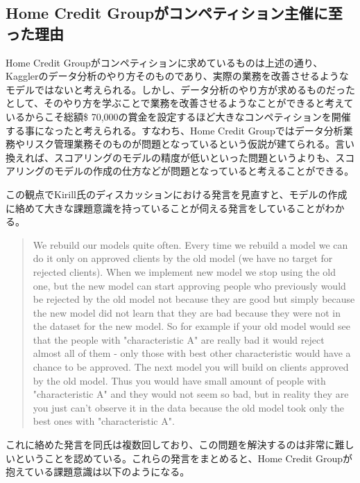 \documentclass[11pt]{jsarticle}
\begin{document}
    \subsection{Home Credit
Groupがコンペティション主催に至った理由}\label{home-credit-groupux304cux30b3ux30f3ux30daux30c6ux30a3ux30b7ux30e7ux30f3ux4e3bux50acux306bux81f3ux3063ux305fux7406ux7531}

    Home Credit
Groupがコンペティションに求めているものは上述の通り、Kagglerのデータ分析のやり方そのものであり、実際の業務を改善させるようなモデルではないと考えられる。しかし、データ分析のやり方が求めるものだったとして、そのやり方を学ぶことで業務を改善させるようなことができると考えているからこそ総額\$
70,000の賞金を設定するほど大きなコンペティションを開催する事になったと考えられる。すなわち、Home
Credit
Groupではデータ分析業務やリスク管理業務そのものが問題となっているという仮説が建てられる。言い換えれば、スコアリングのモデルの精度が低いといった問題というよりも、スコアリングのモデルの作成の仕方などが問題となっていると考えることができる。

    この観点でKirill氏のディスカッションにおける発言を見直すと、モデルの作成に絡めて大きな課題意識を持っていることが伺える発言をしていることがわかる。

\begin{quote}
We rebuild our models quite often. Every time we rebuild a model we can
do it only on approved clients by the old model (we have no target for
rejected clients). When we implement new model we stop using the old
one, but the new model can start approving people who previously would
be rejected by the old model not because they are good but simply
because the new model did not learn that they are bad because they were
not in the dataset for the new model. So for example if your old model
would see that the people with "characteristic A" are really bad it
would reject almost all of them - only those with best other
characteristic would have a chance to be approved. The next model you
will build on clients approved by the old model. Thus you would have
small amount of people with "characteristic A" and they would not seem
so bad, but in reality they are you just can't observe it in the data
because the old model took only the best ones with "characteristic A".
\end{quote}

これに絡めた発言を同氏は複数回しており、この問題を解決するのは非常に難しいということを認めている。これらの発言をまとめると、Home
Credit Groupが抱えている課題意識は以下のようになる。
\end{document}
